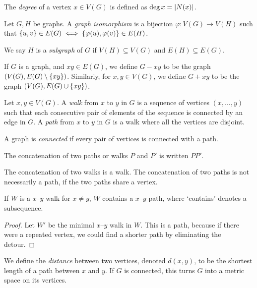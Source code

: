 \begin{definition}
	The \emph{degree} of a vertex \( x \in V(G) \) is defined as \( \deg x = \abs{N(x)} \).
\end{definition}
\begin{definition}
	Let \( G, H \) be graphs.
	A \emph{graph isomorphism} is a bijection \( \varphi \colon V(G) \to V(H) \) such that \( \qty{u,v} \in E(G) \iff \qty{\varphi(u),\varphi(v)} \in E(H) \).
\end{definition}
\begin{definition}
	We say \( H \) is a \emph{subgraph} of \( G \) if \( V(H) \subseteq V(G) \) and \( E(H) \subseteq E(G) \).
\end{definition}
If \( G \) is a graph, and \( xy \in E(G) \), we define \( G - xy \) to be the graph \( (V(G), E(G)\setminus \qty{xy}) \).
Similarly, for \( x, y \in V(G) \), we define \( G + xy \) to be the graph \( (V(G), E(G) \cup \qty{xy}) \).
\begin{definition}
	Let \( x, y \in V(G) \).
	A \emph{walk} from \( x \) to \( y \) in \( G \) is a sequence of vertices \( (x, \dots, y) \) such that each consecutive pair of elements of the sequence is connected by an edge in \( G \).
	A \emph{path} from \( x \) to \( y \) in \( G \) is a walk where all the vertices are disjoint.
\end{definition}
\begin{definition}
	A graph is \emph{connected} if every pair of vertices is connected with a path.
\end{definition}
The concatenation of two paths or walks \( P \) and \( P' \) is written \( PP' \).
\begin{remark}
	The concatenation of two walks is a walk.
	The concatenation of two paths is not necessarily a path, if the two paths share a vertex.
\end{remark}
\begin{proposition}
	If \( W \) is a \( x \)--\( y \) walk for \( x \neq y \), \( W \) contains a \( x \)--\( y \) path, where `contains' denotes a subsequence.
\end{proposition}
\begin{proof}
	Let \( W' \) be the minimal \( x \)--\( y \) walk in \( W \).
	This is a path, because if there were a repeated vertex, we could find a shorter path by eliminating the detour.
\end{proof}
\begin{definition}
	We define the \emph{distance} between two vertices, denoted \( d(x,y) \), to be the shortest length of a path between \( x \) and \( y \).
	If \( G \) is connected, this turns \( G \) into a metric space on its vertices.
\end{definition}

